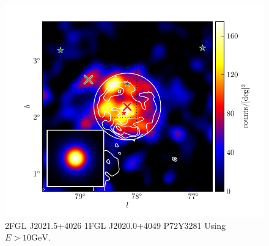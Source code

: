 \documentclass[12pt,preprint]{aastex}
\newcommand{\gev}{\text{GeV}\xspace}
\begin{document}
\begin{figure}
  \begin{center}
    \includegraphics[type=pdf,ext=.pdf,read=.pdf]{source_plots/source_Gamma_Cygni}
  \end{center}
  \caption{
  2FGL J2021.5+4026
  1FGL J2020.0+4049
  P72Y3281
  Using $E>10\gev$. 
  }\label{Gamma_Cygni}
\end{figure}
\end{document}
